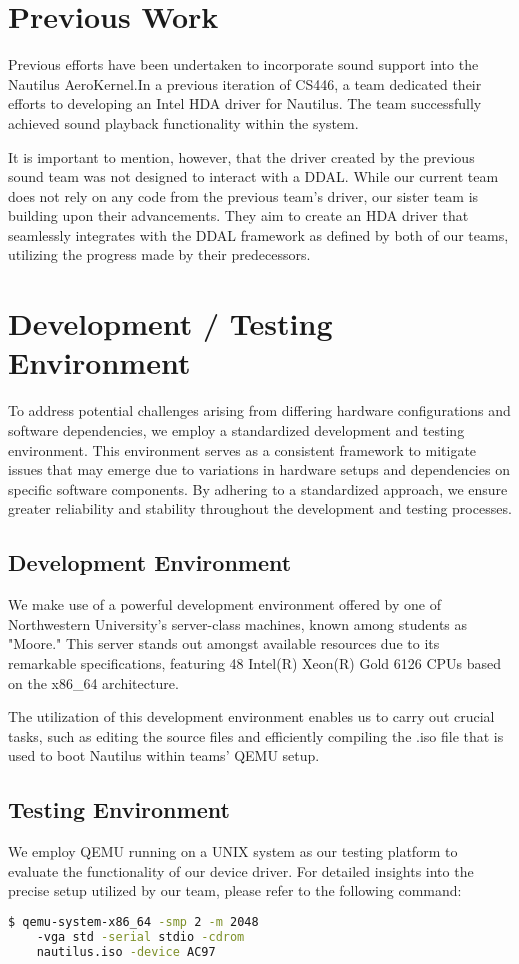 \documentclass[sigplan,screen]{acmart}
\begin{document}
\section{Previous Work}

Previous efforts have been undertaken to incorporate sound support into the Nautilus AeroKernel.In a previous iteration of CS446, a team dedicated their efforts to developing an Intel HDA driver for Nautilus. The team successfully achieved sound playback functionality within the system. 

It is important to mention, however, that the driver created by the previous sound team was not designed to interact with a DDAL. While our current team does not rely on any code from the previous team's driver, our sister team is building upon their advancements. They aim to create an HDA driver that seamlessly integrates with the DDAL framework as defined by both of our teams, utilizing the progress made by their predecessors. 

\section{Development / Testing Environment}
To address potential challenges arising from differing hardware configurations and software dependencies, we employ a standardized development and testing environment. This environment serves as a consistent framework to mitigate issues that may emerge due to variations in hardware setups and dependencies on specific software components. By adhering to a standardized approach, we ensure greater reliability and stability throughout the development and testing processes.


\subsection{Development Environment}
We make use of a powerful development environment offered by one of Northwestern University's server-class machines, known among students as "Moore." This server stands out amongst available resources due to its remarkable specifications, featuring 48 Intel(R) Xeon(R) Gold 6126 CPUs based on the x86\_64 architecture.

The utilization of this development environment enables us to carry out crucial tasks, such as  editing the source files and efficiently compiling the .iso file that is used to boot Nautilus within teams' QEMU setup. 

\subsection{Testing Environment}
We employ QEMU running on a UNIX system as our testing platform to evaluate the functionality of our device driver. For detailed insights into the precise setup utilized by our team, please refer to the following command:
\begin{lstlisting}[language=bash]
  $ qemu-system-x86_64 -smp 2 -m 2048 
    -vga std -serial stdio -cdrom 
    nautilus.iso -device AC97
\end{lstlisting}
\end{document}
